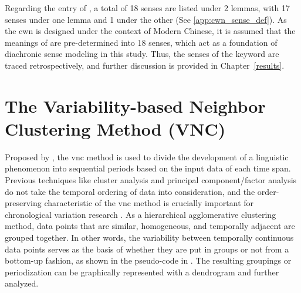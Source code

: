 Regarding the entry of \jia\rspace , a total of 18 senses are listed under 2 lemmas, with 17 senses under one lemma and 1 under the other (See \ref{app:cwn_sense_def}). As the \gls{cwn} is designed under the context of Modern Chinese, it is assumed that the meanings of \jia are pre-determined into 18 senses, which act as a foundation of diachronic sense modeling in this study. Thus, the senses of the keyword \jia are traced retrospectively, and further discussion is provided in Chapter~\ref{results}.

\section{The Variability-based Neighbor Clustering Method (VNC)}
Proposed by \textcite{gries2012variability}, the \gls{vnc} method is used to divide the development of a linguistic phenomenon into sequential periods based on the input data of each time span. Previous techniques like cluster analysis and principal component/factor analysis do not take the temporal ordering of data into consideration, and the order-preserving characteristic of the \gls{vnc} method is crucially important for chronological variation research \parencite{moisl2015cluster}. As a hierarchical agglomerative clustering method, data points that are similar, homogeneous, and temporally adjacent are grouped together. In other words, the variability between temporally continuous data points serves as the basis of whether they are put in groups or not from a bottom-up fashion, as shown in the pseudo-code in . The resulting groupings or periodization can be graphically represented with a dendrogram and further analyzed.

